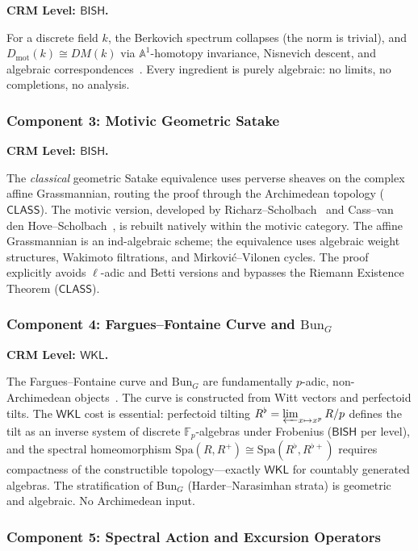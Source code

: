 \documentclass[11pt,a4paper]{article}
\theoremstyle{plain}
\theoremstyle{definition}
\newcommand{\BISH}{\textsf{BISH}}
\newcommand{\WKL}{\textsf{WKL}}
\newcommand{\CLASS}{\textsf{CLASS}}
\newcommand{\Dmot}{D_{\mathrm{mot}}}
\newcommand{\Bun}{\mathrm{Bun}}
\newcommand{\F}{\mathbb{F}}
\newcommand{\A}{\mathbb{A}}
\newcommand{\Spa}{\mathrm{Spa}}
\begin{document}
\textbf{CRM Level: $\BISH$.}

For a discrete field $k$, the Berkovich spectrum collapses (the norm is trivial), and $\Dmot(k) \cong DM(k)$ via $\A^1$-homotopy invariance, Nisnevich descent, and algebraic correspondences~\cite{scholze-berkovich}. Every ingredient is purely algebraic: no limits, no completions, no analysis.

\subsubsection{Component 3: Motivic Geometric Satake}

\textbf{CRM Level: $\BISH$.}

The \emph{classical} geometric Satake equivalence uses perverse sheaves on the complex affine Grassmannian, routing the proof through the Archimedean topology ($\CLASS$). The motivic version, developed by Richarz--Scholbach~\cite{richarz-scholbach} and Cass--van den Hove--Scholbach~\cite{cass-vdh-scholbach}, is rebuilt natively within the motivic category. The affine Grassmannian is an ind-algebraic scheme; the equivalence uses algebraic weight structures, Wakimoto filtrations, and Mirkovi\'c--Vilonen cycles. The proof explicitly avoids $\ell$-adic and Betti versions and bypasses the Riemann Existence Theorem ($\CLASS$).

\subsubsection{Component 4: Fargues--Fontaine Curve and $\Bun_G$}

\textbf{CRM Level: $\WKL$.}

The Fargues--Fontaine curve and $\Bun_G$ are fundamentally $p$-adic, non-Archimedean objects~\cite{fargues-scholze21}. The curve is constructed from Witt vectors and perfectoid tilts. The $\WKL$ cost is essential: perfectoid tilting $R^\flat = \varprojlim_{x \mapsto x^p} R/p$ defines the tilt as an inverse system of discrete $\F_p$-algebras under Frobenius ($\BISH$ per level), and the spectral homeomorphism $\Spa(R, R^+) \cong \Spa(R^\flat, R^{\flat+})$ requires compactness of the constructible topology---exactly $\WKL$ for countably generated algebras. The stratification of $\Bun_G$ (Harder--Narasimhan strata) is geometric and algebraic. No Archimedean input.

\subsubsection{Component 5: Spectral Action and Excursion Operators}
\end{document}
